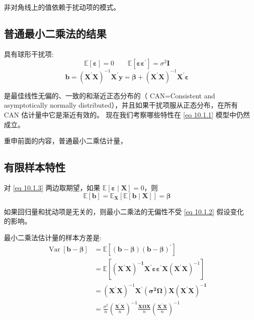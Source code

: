     非对角线上的值依赖于扰动项的模式。

\subsection{普通最小二乘法的结果}
    具有球形干扰项:
    \begin{equation}
        \mathbb{E}[\boldsymbol{\varepsilon}]=0 \qquad  
        \mathbb{E}\left[\boldsymbol{\varepsilon \varepsilon^{\prime}}\right]=\sigma^{2} \boldsymbol{I}
        \label{eq 10.1.2}
    \end{equation}
    \begin{equation}
        \boldsymbol{b} = \left(\boldsymbol{X^{\prime} X}\right)^{-1} \boldsymbol{X^{\prime} y}
        = \boldsymbol{\beta} + \left(\boldsymbol{X^{\prime} X}\right)^{-1} \boldsymbol{X^{\prime} \varepsilon}
        \label{eq 10.1.3}
    \end{equation}

    是最佳线性无偏的、一致的和渐近正态分布的（ CAN=Consistent and asymptotically normally distributed），并且如果干扰项服从正态分布，在所有 CAN 估计量中它是渐近有效的。
    现在我们考察哪些特性在 \ref{eq 10.1.1} 模型中仍然成立。

    重申前面的内容，普通最小二乘估计量，

\subsection{有限样本特性}

    对 \ref{eq 10.1.3} 两边取期望，如果 $ \mathbb{E}[\boldsymbol{\varepsilon \mid X}]=0 $，则
    \begin{equation}
        \mathbb{E} [\boldsymbol{b}]=\mathbb{E}_{\boldsymbol{X}} \left [ \mathbb{E}[\boldsymbol{b \mid X}] \right] = \boldsymbol{\beta}
    \end{equation}

    如果回归量和扰动项是无关的，则最小二乘法的无偏性不受 \ref{eq 10.1.2} 假设变化的影响。

    最小二乘法估计量的样本方差是:
    \begin{equation}
        \begin{aligned}
            \operatorname{Var}[\boldsymbol{b-\beta}] & = \mathbb{E}\left[\boldsymbol{(b-\beta)(b-\beta)^{\prime}}\right] \\
            & = \mathbb{E}\left[ \boldsymbol{\left(X^{\prime} X\right)^{-1}} \boldsymbol{X^{\prime} \varepsilon \varepsilon^{\prime} X}
            \left(\boldsymbol{X^{\prime} X}\right)^{-1}\right] \\
            & = \left(\boldsymbol{X^{\prime} X}\right)^{-1} \boldsymbol{X^{\prime}\left(\sigma^{2} \Omega\right) X\left(X^{\prime} X\right)^{-1}} \\
            & = \frac{\sigma^{2}}{n} \left( \frac{\boldsymbol{X^{\prime} X}}{n}\right)^{-1} 
            \frac{\boldsymbol{X \Omega X}}{n}\left(\frac{\boldsymbol{X^{\prime} X}}{n}\right)^{-1}
        \end{aligned}
        \label{eq 10.1.5}
    \end{equation}

